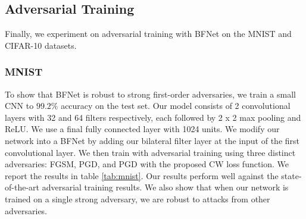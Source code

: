 \documentclass{article} %
\begin{document}
\subsection{Adversarial Training}
Finally, we experiment on adversarial training with BFNet on the MNIST and CIFAR-10 datasets. 


\subsubsection{MNIST}
To show that BFNet is robust to strong first-order adversaries, we train a small CNN to $99.2\%$ accuracy on the test set. Our model consists of 2 convolutional layers with 32 and 64 filters respectively, each followed by 2 x 2 max pooling and ReLU. We use a final fully connected layer with 1024 units. We modify our network into a BFNet by adding our bilateral filter layer at the input of the first convolutional layer. We then train with adversarial training using three distinct adversaries: FGSM, PGD, and PGD with the proposed CW loss function. We report the results in table \ref{tab:mnist}. Our results perform well against the state-of-the-art adversarial training results. We also show that when our network is trained on a single strong adversary, we are robust to attacks from other adversaries. 
\end{document}
